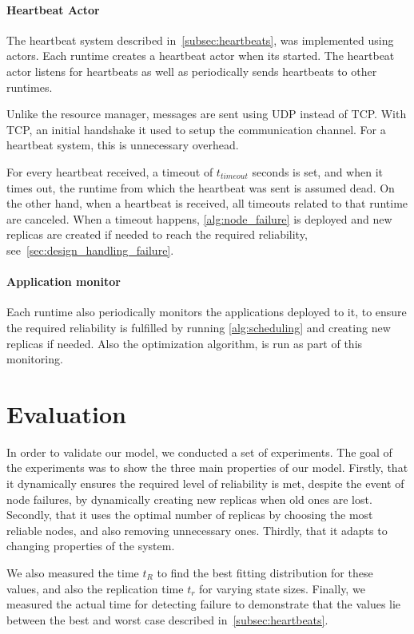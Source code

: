 \documentclass{cslthse-msc}
\begin{document}
\subsubsection{Heartbeat Actor}
The heartbeat system described in~\cref{subsec:heartbeats}, was implemented using actors. Each runtime creates a heartbeat actor when its started. The heartbeat actor listens for heartbeats as well as periodically sends heartbeats to other runtimes.

Unlike the resource manager, messages are sent using UDP instead of TCP. With TCP, an initial handshake it used to setup the communication channel. For a heartbeat system, this is unnecessary overhead. 

For every heartbeat received, a timeout of $t_{timeout}$ seconds is set, and when it times out, the runtime from which the heartbeat was sent is assumed dead. On the other hand, when a heartbeat is received, all timeouts related to that runtime are canceled. When a timeout happens, \cref{alg:node_failure} is deployed and new replicas are created if needed to reach the required reliability, see~\cref{sec:design_handling_failure}.

\subsubsection{Application monitor}
Each runtime also periodically monitors the applications deployed to it, to ensure the required reliability is fulfilled by running \cref{alg:scheduling} and creating new replicas if needed. Also the optimization algorithm, is run as part of this monitoring.

\chapter{Evaluation} \label{ch:evaluation}
In order to validate our model, we conducted a set of experiments. The goal of the experiments was to show the three main properties of our model. Firstly, that it dynamically ensures the required level of reliability is met, despite the event of node failures, by dynamically creating new replicas when old ones are lost. Secondly, that it uses the optimal number of replicas by choosing the most reliable nodes, and also removing unnecessary ones. Thirdly, that it adapts to changing properties of the system. 

We also measured the time $t_R$ to find the best fitting distribution for these values, and also the replication time $t_r$ for varying state sizes. Finally, we measured the actual time for detecting failure to demonstrate that the values lie between the best and worst case described in~\cref{subsec:heartbeats}.
\end{document}
